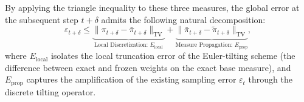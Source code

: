 \documentclass[11pt]{article}
\theoremstyle{definition}
\numberwithin{equation}{section}%
\begin{document}
{By applying the triangle inequality to these three measures, the global error at the subsequent step $t+\delta$ admits the following natural decomposition:
\begin{equation}
\label{eq:tv_decomp_main}
\varepsilon_{t+\delta} \le \underbrace{\|\pi_{t+\delta} - \bar{\pi}_{t+\delta}\|_{\mathrm{TV}}}_{\text{Local Discretization: } E_{\mathrm{local}}} + \underbrace{\|\bar{\pi}_{t+\delta} - \tilde{\pi}_{t+\delta}\|_{\mathrm{TV}}}_{\text{Measure Propagation: } E_{\mathrm{prop}}},
\end{equation}
where $E_{\mathrm{local}}$ isolates the local truncation error of the Euler-tilting scheme (the difference between exact and frozen weights on the exact base measure), and $E_{\mathrm{prop}}$ captures the amplification of the existing sampling error $\varepsilon_t$ through the discrete tilting operator.








}
\end{document}
